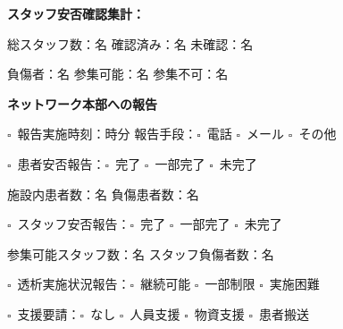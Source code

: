\documentclass[a4paper,12pt]{jarticle}
\newcommand{\checkbox}{$\square$\ }
\newcommand{\underlinespace}[1]{\underline{\hspace{#1}}}
\begin{document}
\vspace{3mm}

\noindent
\textbf{スタッフ安否確認集計：}

\vspace{2mm}

\noindent
総スタッフ数：\underlinespace{2cm}名 \quad 確認済み：\underlinespace{2cm}名 \quad 未確認：\underlinespace{2cm}名

\vspace{2mm}

\noindent
負傷者：\underlinespace{2cm}名 \quad 参集可能：\underlinespace{2cm}名 \quad 参集不可：\underlinespace{2cm}名

\vspace{8mm}

\begin{center}
\textbf{\large ネットワーク本部への報告}
\end{center}

\vspace{3mm}

\noindent
\checkbox 報告実施時刻：\underlinespace{1cm}時\underlinespace{1cm}分 \quad 報告手段：\checkbox 電話 \quad \checkbox メール \quad \checkbox その他

\vspace{3mm}

\noindent
\checkbox 患者安否報告：\checkbox 完了 \quad \checkbox 一部完了 \quad \checkbox 未完了

\vspace{2mm}

\noindent
施設内患者数：\underlinespace{2cm}名 \quad 負傷患者数：\underlinespace{2cm}名

\vspace{3mm}

\noindent
\checkbox スタッフ安否報告：\checkbox 完了 \quad \checkbox 一部完了 \quad \checkbox 未完了

\vspace{2mm}

\noindent
参集可能スタッフ数：\underlinespace{2cm}名 \quad スタッフ負傷者数：\underlinespace{2cm}名

\vspace{3mm}

\noindent
\checkbox 透析実施状況報告：\checkbox 継続可能 \quad \checkbox 一部制限 \quad \checkbox 実施困難

\vspace{3mm}

\noindent
\checkbox 支援要請：\checkbox なし \quad \checkbox 人員支援 \quad \checkbox 物資支援 \quad \checkbox 患者搬送
\end{document}
